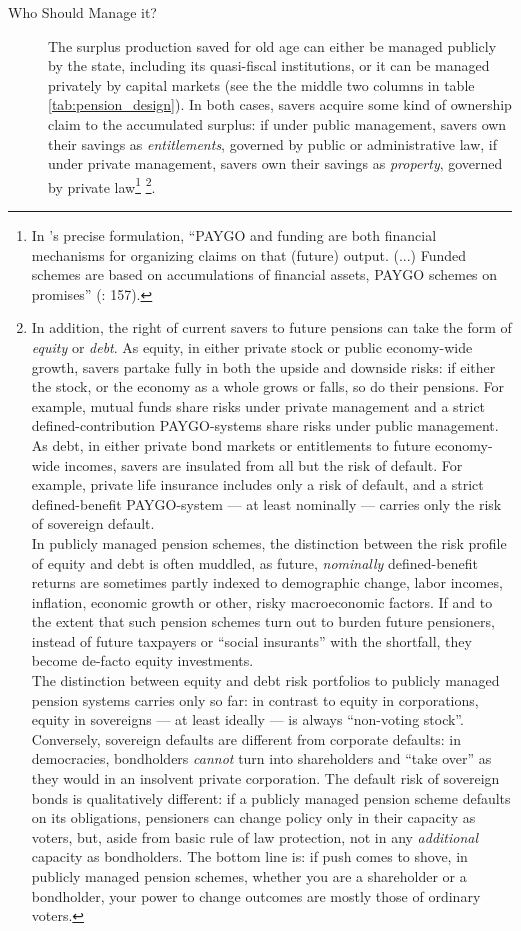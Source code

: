 \documentclass[11pt,a4paper,oneside,openright]{article}
\begin{document}
\begin{description}
	\item[Who Should Manage it?] The surplus production saved for old age can either be managed publicly by the state, including its quasi-fiscal institutions, or it can be managed privately by capital markets (see the the middle two columns in table \ref{tab:pension_design}). In both cases, savers acquire some kind of ownership claim to the accumulated surplus: if under public management, savers own their savings as \emph{entitlements}, governed by public or administrative law, if under private management, savers own their savings as \emph{property}, governed by private law\footnote{
		In \citeauthor{Barr2005a}'s precise formulation, ``PAYGO and funding are both financial mechanisms for organizing claims on that (future) output. (...) Funded schemes are based on accumulations of financial assets, PAYGO schemes on promises'' (\citeyear{Barr2005a}: 157).} \footnote{
		In addition, the right of current savers to future pensions can take the form of \emph{equity} or \emph{debt}. As equity, in either private stock or public economy-wide growth, savers partake fully in both the upside and downside risks: if either the stock, or the economy as a whole grows or falls, so do their pensions. For example, mutual funds share risks under private management and a strict defined-contribution PAYGO-systems share risks under public management. As debt, in either private bond markets or entitlements to future economy-wide incomes, savers are insulated from all but the risk of default. For example, private life insurance includes only a risk of default, and a strict defined-benefit PAYGO-system --- at least nominally --- carries only the risk of sovereign default. \\
		In publicly managed pension schemes, the distinction between the risk profile of equity and debt is often muddled, as future, \emph{nominally} defined-benefit returns are sometimes partly indexed to demographic change, labor incomes, inflation, economic growth or other, risky macroeconomic factors. If and to the extent that such pension schemes turn out to burden future pensioners, instead of future taxpayers or ``social insurants'' with the shortfall, they become de-facto equity investments. \\
		The distinction between equity and debt risk portfolios to publicly managed pension systems carries only so far: in contrast to equity in corporations, equity in sovereigns --- at least ideally --- is always ``non-voting stock''. Conversely, sovereign defaults are different from corporate defaults: in democracies, bondholders \emph{cannot} turn into shareholders and ``take over'' as they would in an insolvent private corporation. The default risk of sovereign bonds is qualitatively different: if a publicly managed pension scheme defaults on its obligations, pensioners can change policy only in their capacity as voters, but, aside from basic rule of law protection, not in any \emph{additional} capacity as bondholders. The bottom line is: if push comes to shove, in publicly managed pension schemes, whether you are a shareholder or a bondholder, your power to change outcomes are mostly those of ordinary voters.}.

\end{description}
\end{document}
